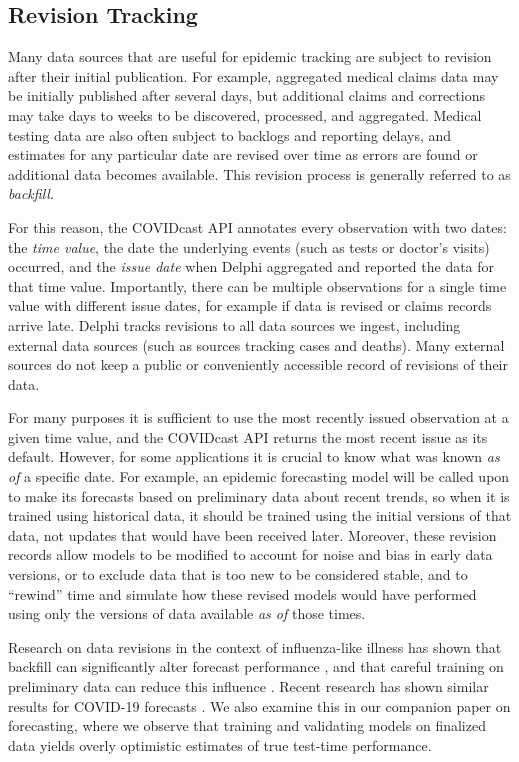 \documentclass[9pt,twocolumn,twoside,lineno]{pnas-new}
\begin{document}
\subsection{Revision Tracking}
\label{subsec:revision_tracking}

Many data sources that are useful for epidemic tracking are subject to revision
after their initial publication. For example, aggregated medical claims data may
be initially published after several days, but additional claims and corrections
may take days to weeks to be discovered, processed, and aggregated. Medical
testing data are also often subject to backlogs and reporting delays, and
estimates for any particular date are revised over time as errors are found or
additional data becomes available. This revision process is generally referred
to as \textit{backfill}.

For this reason, the COVIDcast API annotates every observation with two dates:
the \textit{time value}, the date the underlying events (such as tests or
doctor's visits) occurred, and the \textit{issue date} when Delphi aggregated
and reported the data for that time value. Importantly, there can be multiple
observations for a single time value with different issue dates, for example if
data is revised or claims records arrive late. Delphi tracks revisions to all
data sources we ingest, including external data sources (such as sources
tracking cases and deaths). Many external sources do not keep a public or
conveniently accessible record of revisions of their data.

For many purposes it is sufficient to use the most recently issued observation
at a given time value, and the COVIDcast API returns the most recent issue as
its default. However, for some applications it is crucial to know what was known
\textit{as of} a specific date. For example, an epidemic forecasting model will
be called upon to make its forecasts based on preliminary data about recent
trends, so when it is trained using historical data, it should be trained using
the initial versions of that data, not updates that would have been received
later. Moreover, these revision records allow models to be modified to account
for noise and bias in early data versions, or to exclude data that is too new to
be considered stable, and to ``rewind'' time and simulate how these revised
models would have performed using only the versions of data available \textit{as
  of} those times.

Research on data revisions in the context of influenza-like illness has shown
that backfill can significantly alter forecast performance \cite{Brooks:2018,
  Reich:2019}, and that careful training on preliminary data can reduce this
influence \cite{Brooks:2020}. Recent research has shown similar results for
COVID-19 forecasts \cite{Kamarthi:2021}. We also examine this in our companion  
paper on forecasting, where we observe that training and validating models on
finalized data yields overly optimistic estimates of true test-time
performance. 
\end{document}

